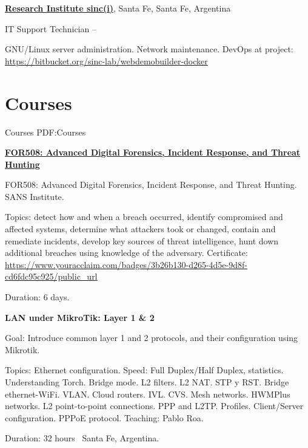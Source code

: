 \documentclass[letterpaper,MMMyyyy,nonstop]{simpleresumecv}
\begin{document}
\begin{body}
\href{http://www.sinc.unl.edu.ar}
{\textbf{Research Institute sinc(i)}},
Santa Fe, Santa Fe, Argentina

\GapNoBreak
\BulletItem
IT Support Technician
\hfill
{} --
\begin{detail}
\SubBulletItem
GNU/Linux server administration.
\SubBulletItem
Network maintenance.
\SubBulletItem
DevOps at project: \href{https://bitbucket.org/sinc-lab/webdemobuilder-docker}{https://bitbucket.org/sinc-lab/webdemobuilder-docker}
\end{detail}


\section
{Courses}
{Courses}
{PDF:Courses}


\href{https://www.sans.org/course/advanced-incident-response-threat-hunting-training}{\textbf{FOR508: Advanced Digital Forensics, Incident Response, and Threat Hunting}}
\hfill
{}

\BulletItem FOR508: Advanced Digital Forensics, Incident Response, and Threat Hunting. SANS Institute.
\begin{detail}
	\SubBulletItem 
	Topics: detect how and when a breach occurred, identify compromised and affected systems, determine what attackers took or changed, contain and remediate incidents, develop key sources of threat intelligence, hunt down additional breaches using knowledge of the adversary.	
	\SubBulletItem
	Certificate: \href{https://www.youracclaim.com/badges/3b26b130-d265-4d5e-9d8f-cd6fdc95c925/public\_url}{https://www.youracclaim.com/badges/3b26b130-d265-4d5e-9d8f-cd6fdc95c925/public\_url}
\end{detail}
Duration: 6 days.

\BigGap
\textbf{LAN under MikroTik: Layer 1 \& 2}
\hfill
{}

\BulletItem Goal: Introduce common layer 1 and 2 protocols, and their configuration using Mikrotik.

\begin{detail}
	\SubBulletItem 
	Topics: Ethernet configuration. Speed: Full Duplex/Half Duplex, statistics. Understanding Torch. Bridge mode.  L2 filters. L2 NAT. STP y RST. Bridge ethernet-WiFi. VLAN. Cloud routers. IVL. CVS. Mesh networks. HWMPlus networks. L2 point-to-point connections. PPP and L2TP. Profiles. Client/Server configuration. PPPoE protocol.
	\SubBulletItem Teaching: Pablo Roa.
\end{detail}
Duration: 32 hours \SubBulletSymbol\, Santa Fe, Argentina.


\end{body}
\end{document}
